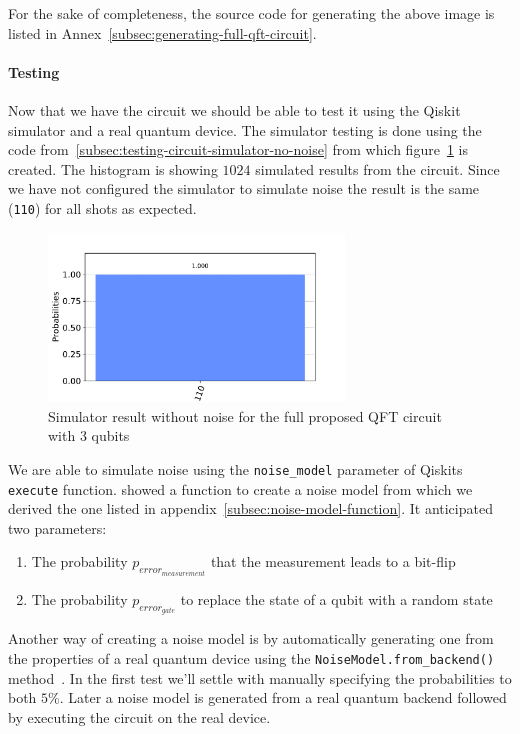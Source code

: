 For the sake of completeness, the source code for generating the above image is listed in Annex~\ref{subsec:generating-full-qft-circuit}.

\paragraph{Testing}

Now that we have the circuit we should be able to test it using the Qiskit simulator and a real quantum device.
The simulator testing is done using the code from~\ref{subsec:testing-circuit-simulator-no-noise} from which figure~\ref{fig:test-histogram} is created.
The histogram is showing \(1024\) simulated results from the circuit.
Since we have not configured the simulator to simulate noise the result is the same (\texttt{110}) for all shots as expected.

\begin{figure}[H]
    \centering
    \includegraphics[width=0.7\textwidth]{res/test-histogram.pdf}
    \caption{Simulator result without noise for the full proposed QFT circuit with 3 qubits}
    \label{fig:test-histogram}
\end{figure}

We are able to simulate noise using the \texttt{noise\_model} parameter of Qiskits \texttt{execute} function.
 showed a function to create a noise model from which we derived the one listed in appendix~\ref{subsec:noise-model-function}.
It anticipated two parameters:
\begin{enumerate}
    \item The probability \(p_{error_{measurement}}\) that the measurement leads to a bit-flip
    \item The probability \(p_{error_{gate}}\) to replace the state of a qubit with a random state
\end{enumerate}

Another way of creating a noise model is by automatically generating one from the properties of a real quantum device using the \texttt{NoiseModel.from\_backend()} method~\cite{QiskitDocsNoise}.
In the first test we'll settle with manually specifying the probabilities to both \(5 \%\).
Later a noise model is generated from a real quantum backend followed by executing the circuit on the real device.

